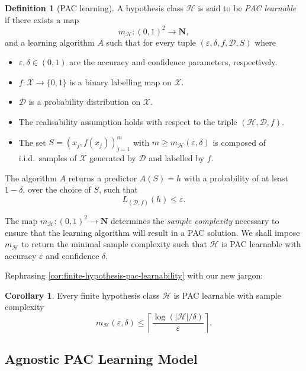 \documentclass[11pt, reqno]{amsart}
\theoremstyle{definition}
\newtheorem{corollary}[theorem]{Corollary}
\newtheorem{definition}[theorem]{Definition}
\renewcommand{\leq}{\leqslant}
\renewcommand{\geq}{\geqslant}
\newcommand{\N}{\mathbf{N}}
\begin{document}
\begin{definition}[PAC learning]
\label{def:pac-learning}
A hypothesis class \(\mathcal{H}\) is said to be \emph{PAC learnable} if there
exists a map
\[
m_{\mathcal{H}}: (0, 1)^2 \longrightarrow \N,
\]
and a learning algorithm \(A\) such that for every tuple
\((\varepsilon, \delta, f, \mathcal{D}, S)\) where
\begin{itemize}\setlength\itemsep{0em}
\item \(\varepsilon, \delta \in (0, 1)\) are the accuracy and confidence
  parameters, respectively.
\item \(f: \mathcal{X} \to \{0, 1\}\) is a binary labelling map on \(\mathcal{X}\).
\item \(\mathcal{D}\) is a probability distribution on \(\mathcal{X}\).
\item The realisability assumption holds with respect to the triple
  \((\mathcal{H}, \mathcal{D}, f)\).
\item The set \(S = (x_j, f(x_j))_{j=1}^m\) with \(m \geq
  m_{\mathcal{H}}(\varepsilon, \delta)\) is composed of i.i.d.~samples of
  \(\mathcal{X}\) generated by \(\mathcal{D}\) and labelled by \(f\).
\end{itemize}
The algorithm \(A\) returns a predictor \(A(S) = h\) with a probability of at
least \(1 - \delta\), over the choice of \(S\), such that
\[
L_{(\mathcal{D}, f)}(h) \leq \varepsilon.
\]

The map \(m_{\mathcal{H}}: (0, 1)^2 \to \N\) determines the \emph{sample
  complexity} necessary to ensure that the learning algorithm will result in a
PAC solution. We shall impose \(m_{\mathcal{H}}\) to return the minimal sample
complexity such that \(\mathcal{H}\) is PAC learnable with accuracy
\(\varepsilon\) and confidence \(\delta\).
\end{definition}

Rephrasing \cref{cor:finite-hypothesis-pac-learnability} with our new jargon:

\begin{corollary}
\label{cor:finite-hypothesis-pac-learnability-succint}
Every finite hypothesis class \(\mathcal{H}\) is PAC learnable with sample complexity
\[
m_{\mathcal{H}}(\varepsilon, \delta) \leq
\left\lceil \frac{\log(|\mathcal{H}| / \delta)}{\varepsilon} \right\rceil.
\]
\end{corollary}

\subsection{Agnostic PAC Learning Model}
\end{document}
